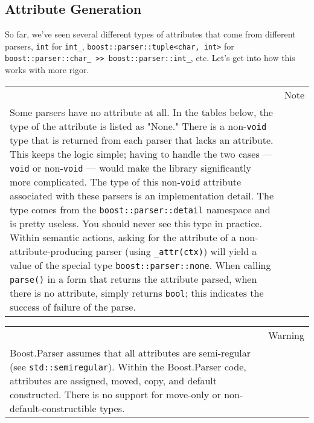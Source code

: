\subsection{Attribute Generation}

So far, we've seen several different types of attributes that come from different parsers, \texttt{int} for \texttt{int\_}, \texttt{boost::parser::tuple<char, int>} for \texttt{boost::parser::char\_ >> boost::parser::int\_}, etc. Let's get into how this works with more rigor.

\begin{longtable}[]{@{}
  >{\raggedright\arraybackslash}p{}
  >{\raggedright\arraybackslash}p{}@{}}
\toprule\noalign{}
\endhead
\bottomrule\noalign{}
\endlastfoot
\begin{minipage}[t]{\linewidth}\raggedright
\end{minipage} & Note \\
Some parsers have no attribute at all. In the tables below, the type of the attribute is listed as "None." There is a non-\texttt{void} type that is returned from each parser that lacks an attribute. This keeps the logic simple; having to handle the two cases --- \texttt{void} or non-\texttt{void} --- would make the library significantly more complicated. The type of this non-\texttt{void} attribute associated with these parsers is an implementation detail. The type comes from the \texttt{boost::parser::detail} namespace and is pretty useless. You should never see this type in practice. Within semantic actions, asking for the attribute of a non-attribute-producing parser (using \texttt{\_attr(ctx)}) will yield a value of the special type \texttt{boost::parser::none}. When calling \texttt{parse()} in a form that returns the attribute parsed, when there is no attribute, simply returns \texttt{bool}; this indicates the success of failure of the parse. & \\
\end{longtable}

\begin{longtable}[]{@{}
  >{\raggedright\arraybackslash}p{}
  >{\raggedright\arraybackslash}p{}@{}}
\toprule\noalign{}
\endhead
\bottomrule\noalign{}
\endlastfoot
\begin{minipage}[t]{\linewidth}\raggedright
\end{minipage} & Warning \\
Boost.Parser assumes that all attributes are semi-regular (see \texttt{std::semiregular}). Within the Boost.Parser code, attributes are assigned, moved, copy, and default constructed. There is no support for move-only or non-default-constructible types. & \\
\end{longtable}


